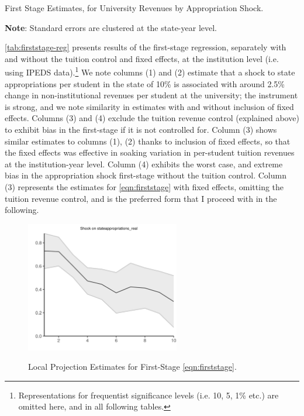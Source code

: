 \documentclass[notitlepage,12pt]{article}
\begin{document}
\begin{table}[!h]
    \singlespacing
    \centering
    \caption{First Stage Estimates, for University Revenues by Appropriation Shock.}
    \makebox[\textwidth][c]{}
    \label{tab:firststage-reg}
    \begin{flushleft}
        \footnotesize
        \textbf{Note}: Standard errors are clustered at the state-year level.
    \end{flushleft}
\end{table}

\autoref{tab:firststage-reg} presents results of the first-stage regression, separately with and without the tuition control and fixed effects, at the institution level (i.e. using IPEDS data).\footnote{
    Representations for frequentist significance levels (i.e. 10, 5, 1\% etc.) are omitted here, and in all following tables.
}
We note columns (1) and (2) estimate that a shock to state appropriations per student in the state of 10\% is associated with around 2.5\% change in non-institutional revenues per student at the university; the instrument is strong, and we note similarity in estimates with and without inclusion of fixed effects.
Columns (3) and (4) exclude the tuition revenue control (explained above) to exhibit bias in the first-stage if it is not controlled for.
Column (3) shows similar estimates to columns (1), (2) thanks to inclusion of fixed effects, so that the fixed effects was effective in soaking variation in per-student tuition revenues at the institution-year level.
Column (4) exhibits the worst case, and extreme bias in the appropriation shock first-stage without the tuition control.
Column (3) represents the estimates for \autoref{eqn:firststage} with fixed effects, omitting the tuition revenue control, and is the preferred form that I proceed with in the following.

\begin{figure}[h!]
    \centering
    \singlespacing
    \caption{Local Projection Estimates for First-Stage \autoref{eqn:firststage}.}
    \includegraphics[width=0.6\textwidth]{figures/firststage-lp.png}
    \label{fig:firststage-lp}
\end{figure}
\end{document}
